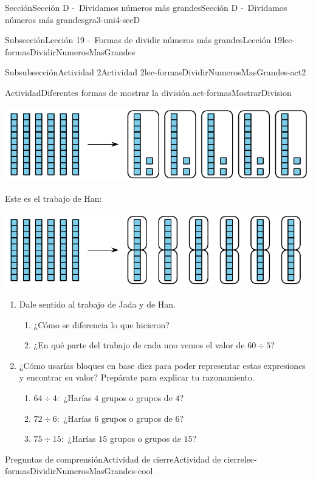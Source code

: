 \documentclass[twoside,10pt,]{article}
\begin{document}
\begin{sectionptx}{Sección}{Sección D -~Dividamos números más grandes}{}{Sección D -~Dividamos números más grandes}{}{}{gra3-uni4-secD}
\begin{subsectionptx}{Subsección}{Lección 19 -~Formas de dividir números más grandes}{}{Lección 19}{}{}{lec-formasDividirNumerosMasGrandes}
\begin{subsubsectionptx}{Subsubsección}{Actividad 2}{}{Actividad 2}{}{}{lec-formasDividirNumerosMasGrandes-act2}
\begin{activity}{Actividad}{Diferentes formas de mostrar la división.}{act-formasMostrarDivision}
\begin{image}{0}{1}{0}{}
\includegraphics[width=\linewidth]{external/svg-source/tikz-file-152963-scale13.pdf}
\end{image}%
Este es el trabajo de Han:%
\begin{image}{0}{1}{0}{}%
\includegraphics[width=\linewidth]{external/svg-source/tikz-file-152964-scale13.pdf}
\end{image}%
%
\begin{enumerate}
\item{}Dale sentido al trabajo de Jada y de Han.%
%
\begin{enumerate}
\item{}¿Cómo se diferencia lo que hicieron?%
\item{}¿En qué parte del trabajo de cada uno vemos el valor de \(60 \div 5\)?%
\end{enumerate}
\item{}¿Cómo usarías bloques en base diez para poder representar estas expresiones y encontrar su valor? Prepárate para explicar tu razonamiento.%
%
\begin{enumerate}
\item{}\(64 \div 4:\) ¿Harías \(4\) grupos o grupos de \(4\)?%
\item{}\(72 \div 6:\) ¿Harías \(6\) grupos o grupos de \(6\)?%
\item{}\(75 \div 15:\) ¿Harías \(15\) grupos o grupos de \(15\)?%
\end{enumerate}
\end{enumerate}
\end{activity}%
\end{subsubsectionptx}
%
%
\typeout{************************************************}
\typeout{************************************************}
%
\begin{reading-questions-subsubsection}{Preguntas de comprensión}{Actividad de cierre}{}{Actividad de cierre}{}{}{lec-formasDividirNumerosMasGrandes-cool}

\end{reading-questions-subsubsection}
\end{subsectionptx}
\end{sectionptx}
\end{document}
